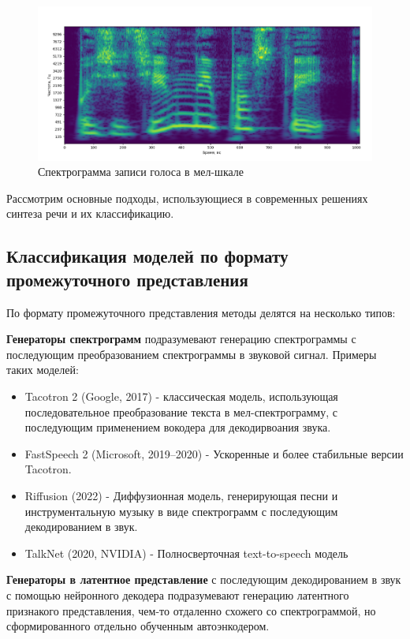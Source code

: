 \begin{figure}
  \centering
  \includegraphics[width=16cm]{figures/mel_spec}
  \caption{Спектрограмма записи голоса в мел-шкале}
  \label{fig:mel_spec}
\end{figure}


Рассмотрим основные подходы, использующиеся в современных решениях синтеза речи и их классификацию.


\subsection{Классификация моделей по формату промежуточного представления}
По формату промежуточного представления методы делятся на несколько типов:

\textbf{Генераторы спектрограмм} подразумевают генерацию спектрограммы с последующим преобразованием спектрограммы в звуковой сигнал. Примеры таких моделей:
\begin{itemize}
  \item Tacotron 2 (Google, 2017) \cite{Tacotron2} - классическая модель, использующая последовательное преобразование текста в мел-спектрограмму, с последующим применением вокодера для декодирвоания звука.
  \item FastSpeech 2 (Microsoft, 2019–2020) \cite{FastSpeech2} - Ускоренные и более стабильные версии Tacotron.
  \item Riffusion (2022) \cite{Riffusion} - Диффузионная модель, генерирующая песни и инструментальную музыку в виде спектрограмм с последующим декодированием в звук.
  \item TalkNet (2020, NVIDIA) \cite{TalkNet} - Полносверточная text-to-speech модель
\end{itemize}

\textbf{Генераторы в латентное представление} с последующим декодированием в звук с помощью нейронного декодера подразумевают 
генерацию латентного признакого представления, чем-то отдаленно схожего со спектрограммой, но сформированного отдельно обученным автоэнкодером.

